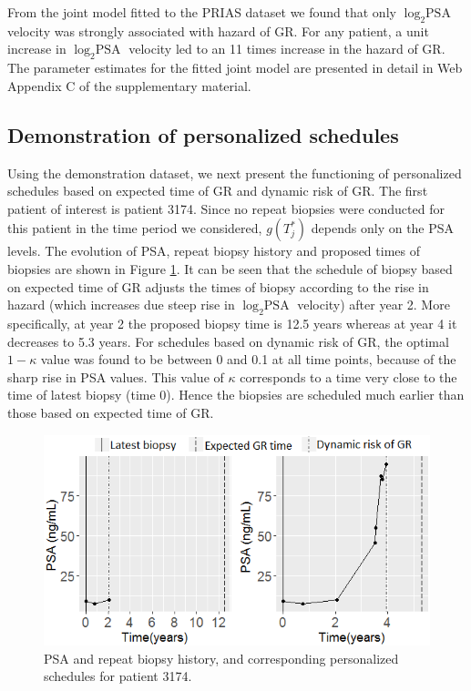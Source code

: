 From the joint model fitted to the PRIAS dataset we found that only $\log_2 \mbox{PSA}$ velocity was strongly associated with hazard of GR. For any patient, a unit increase in $\log_2 \mbox{PSA}$ velocity led to an 11 times increase in the hazard of GR. The parameter estimates for the fitted joint model are presented in detail in Web Appendix C of the supplementary material. 

\subsection{Demonstration of personalized schedules}
\label{subsec : demo_prias_pers_schedule}
Using the demonstration dataset, we next present the functioning of personalized schedules based on expected time of GR and dynamic risk of GR. The first patient of interest is patient 3174. Since no repeat biopsies were conducted for this patient in the time period we considered, $g(T^*_j)$ depends only on the PSA levels. The evolution of PSA, repeat biopsy history and proposed times of biopsies are shown in Figure \ref{fig : prias_demo_pid_3174}. It can be seen that the schedule of biopsy based on expected time of GR adjusts the times of biopsy according to the rise in hazard (which increases due steep rise in $\log_2 \mbox{PSA}$ velocity) after year 2. More specifically, at year 2 the proposed biopsy time is 12.5 years whereas at year 4 it decreases to 5.3 years. For schedules based on dynamic risk of GR, the optimal $1 - \kappa$ value was found to be between 0 and 0.1 at all time points, because of the sharp rise in PSA values. This value of $\kappa$ corresponds to a time very close to the time of latest biopsy (time 0). Hence the biopsies are scheduled much earlier than those based on expected time of GR.


\begin{figure}
\centerline{\includegraphics[width=\columnwidth]{images/prias_demo/case_3174.png}}
\caption{PSA and repeat biopsy history, and corresponding personalized schedules for patient 3174.}
\label{fig : prias_demo_pid_3174}
\end{figure}


